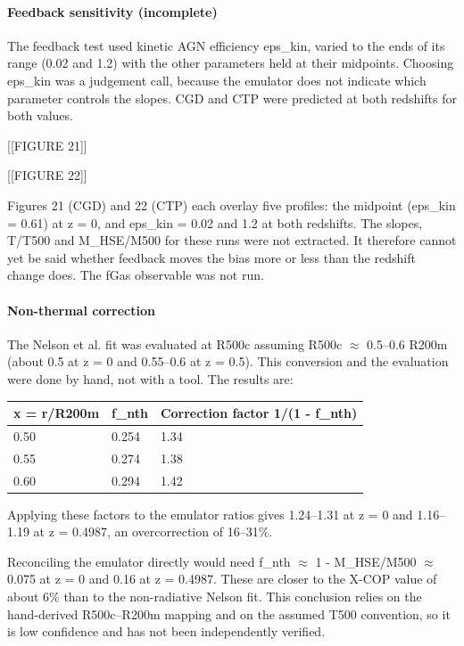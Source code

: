 \documentclass[11pt,a4paper]{article}
\begin{document}
\paragraph{Feedback sensitivity (incomplete)}
The feedback test used kinetic AGN efficiency eps\_kin, varied to the ends of its range (0.02 and 1.2) with the other parameters held at their midpoints. Choosing eps\_kin was a judgement call, because the emulator does not indicate which parameter controls the slopes. CGD and CTP were predicted at both redshifts for both values.

[[FIGURE 21]]

[[FIGURE 22]]

Figures 21 (CGD) and 22 (CTP) each overlay five profiles: the midpoint (eps\_kin = 0.61) at z = 0, and eps\_kin = 0.02 and 1.2 at both redshifts. The slopes, T/T500 and M\_HSE/M500 for these runs were not extracted. It therefore cannot yet be said whether feedback moves the bias more or less than the redshift change does. The fGas observable was not run.

\paragraph{Non-thermal correction}
The Nelson et al. fit was evaluated at R500c assuming R500c $\approx$ 0.5--0.6 R200m (about 0.5 at z = 0 and 0.55--0.6 at z = 0.5). This conversion and the evaluation were done by hand, not with a tool. The results are:

\begin{longtable}{@{}p{}p{}p{}@{}}
\toprule
\textbf{x = r/R200m} & \textbf{f\_nth} & \textbf{Correction factor 1/(1 - f\_nth)} \\ \midrule \endhead
0.50 & 0.254 & 1.34 \\
0.55 & 0.274 & 1.38 \\
0.60 & 0.294 & 1.42 \\
\bottomrule\end{longtable}
Applying these factors to the emulator ratios gives 1.24--1.31 at z = 0 and 1.16--1.19 at z = 0.4987, an overcorrection of 16--31\%.

Reconciling the emulator directly would need f\_nth $\approx$ 1 - M\_HSE/M500 $\approx$ 0.075 at z = 0 and 0.16 at z = 0.4987. These are closer to the X-COP value of about 6\% than to the non-radiative Nelson fit. This conclusion relies on the hand-derived R500c--R200m mapping and on the assumed T500 convention, so it is low confidence and has not been independently verified.
\end{document}
